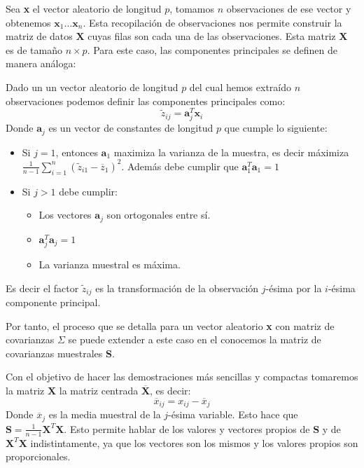 \noindent Sea \textbf{x} el vector aleatorio de longitud $p$, tomamos $n$ observaciones de ese vector y obtenemos $\textbf{x}_1\ldots \textbf{x}_n$.
Esta recopilación de observaciones nos permite construir la matriz de datos $\textbf{X}$ cuyas filas son cada una de las observaciones. Esta matriz \textbf{X} es de tamaño $n\times p$. 
Para este caso, las componentes principales se definen de manera análoga:
\begin{defi}
Dado un un vector aleatorio de longitud $p$ del cual hemos extraído $n$ observaciones podemos definir las componentes principales como:
\begin{equation}
\widetilde{z}_{ij}=\textbf{a}^T_j\textbf{x}_i
\end{equation}
Donde $\textbf{a}_j$ es un vector de constantes de longitud $p$ que cumple lo siguiente:
\begin{itemize}
\item Si $j=1$, entonces $\textbf{a}_1$ maximiza la varianza de la muestra, es decir máximiza $\frac{1}{n-1}\sum_{i=1}^{n}(\widetilde{z}_{i1}-\overline{z}_1)^2$. Además debe cumplir que $\textbf{a}_1^T\textbf{a}_1=1$
\item Si $j>1$ debe cumplir:
\begin{itemize}
\item Los vectores $\textbf{a}_j$ son ortogonales entre sí. 
\item $\textbf{a}_j^T \textbf{a}_j=1$
\item La varianza muestral es máxima. 
\end{itemize}
\end{itemize}
Es decir el factor $\widetilde{z}_{ij}$ es la transformación de la observación $j$-ésima por la $i$-ésima componente principal. 
 
\end{defi}

\noindent Por tanto, el proceso que se detalla para un vector aleatorio \textbf{x} con matriz de covarianzas $\Sigma$ se puede extender a este caso en el conocemos la matriz de covarianzas muestrales \textbf{S}.

\noindent Con el objetivo de hacer las demostraciones más sencillas y compactas tomaremos la matriz $\textbf{X}$ la matriz centrada $\overline{\textbf{X}}$, es decir: 
\begin{equation}
\overline{x}_{ij}=x_{ij}-\overline{x}_j
\end{equation}
Donde $\overline{x}_j$ es la media muestral de la $j$-ésima variable. Esto hace que $\textbf{S}=\frac{1}{n-1}\textbf{X}^T\textbf{X}$. Esto permite hablar de los valores y vectores propios de \textbf{S} y de $\textbf{X}^T \textbf{X}$ indistintamente, ya que los vectores son los mismos y los valores propios son proporcionales. 

